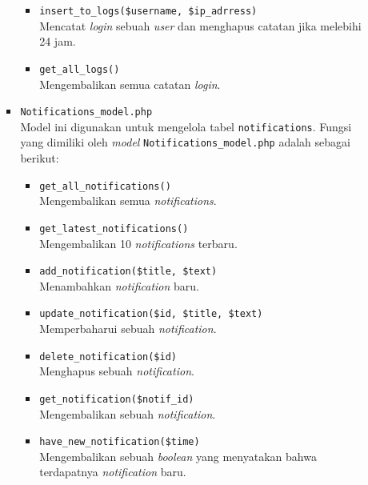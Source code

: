 \documentclass[a4paper,twoside]{article}
\begin{document}
\begin{enumerate}
\begin{itemize}
\begin{itemize}
			                  \begin{itemize}
				                  \item \verb|insert_to_logs($username, $ip_adrress)| \\
				                        Mencatat \textit{login} sebuah \textit{user} dan menghapus catatan jika melebihi 24 jam.
				                  \item \verb|get_all_logs()| \\
				                        Mengembalikan semua catatan \textit{login}.
			                  \end{itemize}

			            \item \verb|Notifications_model.php| \\
			                  Model ini digunakan untuk mengelola tabel \verb|notifications|. Fungsi yang dimiliki oleh \textit{model} \verb|Notifications_model.php| adalah sebagai berikut:

			                  \begin{itemize}
				                  \item \verb|get_all_notifications()| \\
				                        Mengembalikan semua \textit{notifications}.
				                  \item \verb|get_latest_notifications()| \\
				                        Mengembalikan 10 \textit{notifications} terbaru.
				                  \item \verb|add_notification($title, $text)| \\
				                        Menambahkan \textit{notification} baru.
				                  \item \verb|update_notification($id, $title, $text)| \\
				                        Memperbaharui sebuah \textit{notification}.
				                  \item \verb|delete_notification($id)| \\
				                        Menghapus sebuah \textit{notification}.
				                  \item \verb|get_notification($notif_id)| \\
				                        Mengembalikan sebuah \textit{notification}.
				                  \item \verb|have_new_notification($time)| \\
				                        Mengembalikan sebuah \textit{boolean} yang menyatakan bahwa terdapatnya \textit{notification} baru.
			                  \end{itemize}


\end{itemize}
\end{itemize}
\end{enumerate}
\end{document}
